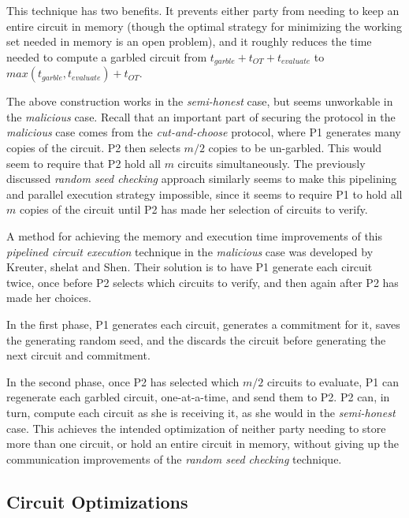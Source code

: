 This technique has two benefits.  It prevents either party from needing to keep an entire circuit in memory (though the optimal strategy for minimizing the working set needed in memory is an open problem\cite{kreuter2012billion}), and it roughly reduces the time needed to compute a garbled circuit from $t_{garble} + t_{OT} + t_{evaluate}$ to $max(t_{garble}, t_{evaluate}) + t_{OT}$.

The above construction works in the \emph{semi-honest} case, but seems unworkable in the \emph{malicious} case.  Recall that an important part of securing the protocol in the \emph{malicious} case comes from the \emph{cut-and-choose} protocol, where \ac{P1} generates many copies of the circuit.  \ac{P2} then selects $m/2$ copies to be un-garbled.  This would seem to require that \ac{P2} hold all $m$ circuits simultaneously.  The previously discussed \emph{random seed checking} approach similarly seems to make this pipelining and parallel execution strategy impossible, since it seems to require \ac{P1} to hold all $m$ copies of the circuit until \ac{P2} has made her selection of circuits to verify.

A method for achieving the memory and execution time improvements of this \emph{pipelined circuit execution} technique in the \emph{malicious} case was developed by Kreuter, shelat and Shen\cite{kreuter2012billion}. Their solution is to have \ac{P1} generate each circuit twice, once before \ac{P2} selects which circuits to verify, and then again after \ac{P2} has made her choices.

In the first phase, \ac{P1} generates each circuit, generates a commitment for it, saves the generating random seed, and the discards the circuit before generating the next circuit and commitment.

In the second phase, once \ac{P2} has selected which $m/2$ circuits to evaluate, \ac{P1} can regenerate each garbled circuit, one-at-a-time, and send them to \ac{P2}.  \ac{P2} can, in turn, compute each circuit as she is receiving it, as she would in the \emph{semi-honest} case.  This achieves the intended optimization of neither party needing to store more than one circuit, or hold an entire circuit in memory, without giving up the communication improvements of the \emph{random seed checking} technique.


\subsection{Circuit Optimizations}

